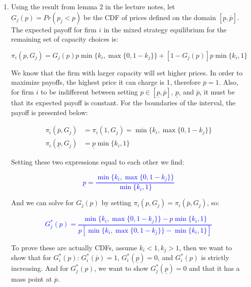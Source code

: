 \documentclass[11pt,english]{article}
\begin{document}
\begin{enumerate}
\item Using the result from lemma 2 in the lecture notes, let $G_{j}(p)=Pr(p_{j}<p)$ be the CDF of prices defined on the domain ${[\underline{p}, \overline{p}]}$. The expected payoff for firm $i$ in the mixed strategy equilibrium for the remaining set of capacity choices is:

\begin{equation}
\pi_{i}(p,G_{j})=G_{j}(p)p\min\{k_{i}, \max\{0,1-k_{j}\}\}+[1-G_{j}(p)]p\min\{k_{i},1\}
\end{equation}

We know that the firm with larger capacity will set higher prices. In order to maximize payoffs, the highest price it can charge is 1, therefore $\overline{p}=1$. Also, for firm $i$ to be indifferent between setting $p\in{[\underline{p},\overline{p}]}$, $\underline{p}$, and $\overline{p}$, it must be that its expected payoff is constant. For the boundaries of the interval, the payoff is presented below:

\begin{align}
\pi_{i}(\overline{p},G_{j})&=\pi_{i}(1,G_{j})=\min\{k_{i}, \max\{0,1-k_{j}\}\}\nonumber\\
\pi_{i}(\underline{p},G_{j})&=\underline{p}\min\{k_{i},1\}\nonumber
\end{align}

Setting these two expressions equal to each other we find:

\textcolor{blue}{\begin{equation}
\underline{p}=\frac{\min\{k_{i}, \max\{0,1-k_{j}\}\}}{\min\{k_{i},1\}}
\end{equation}}

And we can solve for $G_{j}(p)$ by setting $\pi_{i}(p,G_{j})=\pi_{i}(\overline{p},G_{j})$, so:

\textcolor{blue}{\begin{equation}
G^{*}_{j}(p)=\frac{\min\{k_{i}, \max\{0,1-k_{j}\}\}-p\min\{k_{i},1\}}{p[\min\{k_{i}, \max\{0,1-k_{j}\}\}-\min\{k_{i},1\}]}
\end{equation}}

To prove these are actually CDFs, assume $k_{i}<1, k_{j}>1$, then we want to show that for $G_{i}^{*}(p)$:  $G_{i}^{*}(\overline{p})=1$, $G_{i}^{*}(\underline{p})=0$, and $G_{i}^{*}(p)$ is strictly increasing. And for $G_{j}^{*}(p)$, we want to show $G_{j}^{*}(\underline{p})=0$ and that it has a mass point at $\overline{p}$. 


\end{enumerate}
\end{document}
